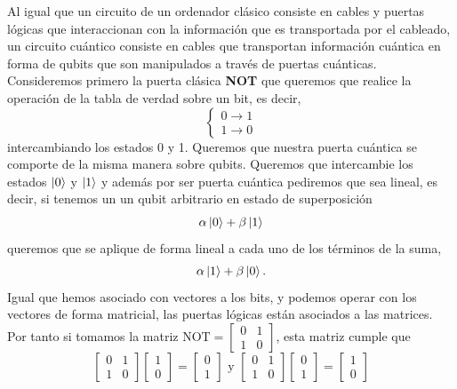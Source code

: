 \documentclass[a4paper]{article}
\numberwithin{equation}{section}
\begin{document}
Al igual que un circuito de un ordenador clásico consiste en cables y puertas lógicas que interaccionan con la información que es transportada por el cableado, un circuito cuántico consiste en cables que transportan información cuántica en forma de qubits que son manipulados a través de puertas cuánticas.\\
\linebreak
Consideremos primero la puerta clásica \textbf{NOT} que queremos que realice la operación de la tabla de verdad sobre un bit, es decir,
\begin{equation}
\begin{cases}
0 \rightarrow 1 \\
1 \rightarrow 0
\end{cases}
\end{equation}
intercambiando los estados 0 y 1. Queremos que nuestra puerta cuántica se comporte de la misma manera sobre qubits. Queremos que intercambie los estados $\ket{0}$ y $\ket{1}$ y además por ser puerta cuántica pediremos que sea lineal, es decir, si tenemos un un qubit arbitrario en estado de superposición
\begin{equation}
\alpha\ket{0} + \beta\ket{1}
\end{equation}
queremos que se aplique de forma lineal a cada uno de los términos de la suma,
\begin{equation}
\alpha\ket{1} + \beta\ket{0}.
\end{equation}
Igual que hemos asociado con vectores a los bits, y podemos operar con los vectores de forma matricial, las puertas lógicas están asociados a las matrices.
Por tanto si tomamos la matriz $\textrm{NOT} = \begin{bmatrix} 0 & 1 \\ 1 & 0 \end{bmatrix}$, esta matriz cumple que
\begin{equation}
\begin{bmatrix}
0 & 1 \\
1 & 0
\end{bmatrix}
\begin{bmatrix}
1 \\ 0
\end{bmatrix} =
\begin{bmatrix}
0 \\ 1
\end{bmatrix}
\textrm{ y }
\begin{bmatrix}
0 & 1 \\
1 & 0
\end{bmatrix}
\begin{bmatrix}
0 \\ 1
\end{bmatrix} =
\begin{bmatrix}
1 \\ 0
\end{bmatrix}
\end{equation}
\end{document}
